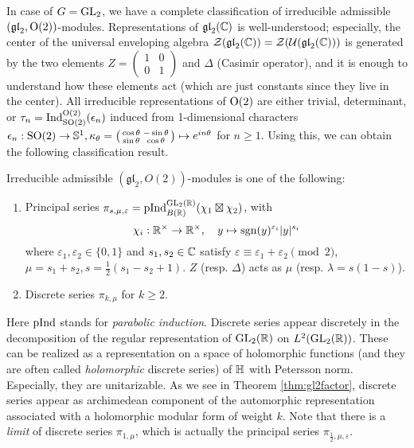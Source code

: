 In case of $G = \mathrm{GL}_2$, we have a complete classification of irreducible admissible $(\mathfrak{gl}_{2}, \mathrm{O}(2))$-modules.
Representations of $\mathfrak{gl}_2(\mathbb{C})$ is well-understood; especially, the center of the universal enveloping algebra $\mathcal{Z}(\mathfrak{gl}_2(\mathbb{C})) = \mathcal{Z}(\mathcal{U}(\mathfrak{gl}_2(\mathbb{C})))$ is generated by the two elements $Z = \left(\begin{smallmatrix} 1 & 0 \\ 0 & 1 \end{smallmatrix}\right)$ and $\Delta$ (Casimir operator), and it is enough to understand how these elements act (which are just constants since they live in the center).
All irreducible representations of $\mathrm{O}(2)$ are either trivial, determinant, or $\tau_n = \mathrm{Ind}_{\mathrm{SO}(2)}^{\mathrm{O}(2)} (\epsilon_n)$ induced from 1-dimensional characters $\epsilon_n : \mathrm{SO}(2) \to \mathbb{S}^1, \kappa_\theta = \left( \begin{smallmatrix} \cos \theta & -\sin \theta \\ \sin \theta & \cos \theta \end{smallmatrix} \right) \mapsto e^{i n \theta}$ for $n \ge 1$.
Using this, we can obtain the following classification result.

\begin{theorem}
Irreducible admissible $(\mathfrak{gl}_2, O(2))$-modules is one of the following:
\begin{enumerate}
    \item Principal series $\pi_{s, \mu, \varepsilon} = \mathrm{pInd}_{B(\mathbb{R})}^{\mathrm{GL}_2(\mathbb{R})} (\chi_{1} \boxtimes \chi_2)$, with
    $$
        \chi_i: \mathbb{R}^\times \to \mathbb{R}^\times, \quad y \mapsto \mathrm{sgn}(y)^{\varepsilon_i} |y|^{s_i}
    $$
    where $\varepsilon_1, \varepsilon_2 \in \{0, 1\}$ and $s_1, s_2 \in \mathbb{C}$ satisfy $\varepsilon \equiv \varepsilon_1 + \varepsilon_2 \pmod{2}$, $\mu = s_1 + s_2, s = \frac{1}{2}(s_1 - s_2 + 1)$.
    $Z$ (resp. $\Delta$) acts as $\mu$ (resp. $\lambda = s (1 - s)$).
    \item Discrete series $\pi_{k, \mu}$ for $k \ge 2$.
\end{enumerate}
\end{theorem}
Here $\mathrm{pInd}$ stands for \emph{parabolic induction}.
Discrete series appear discretely in the decomposition of the regular representation of $\mathrm{GL}_2(\mathbb{R})$ on $L^2(\mathrm{GL}_2(\mathbb{R}))$.
These can be realized as a representation on a space of holomorphic functions (and they are often called \emph{holomorphic} discrete series) of $\mathbb{H}$ with Petersson norm.
Especially, they are unitarizable.
As we see in Theorem \ref{thm:gl2factor}, discrete series appear as archimedean component of the automorphic representation associated with a holomorphic modular form of weight $k$.
Note that there is a \emph{limit} of discrete series $\pi_{1, \mu}$, which is actually the principal series $\pi_{\frac{1}{2}, \mu, \varepsilon}$.

